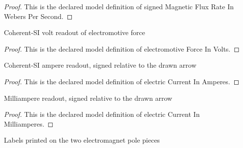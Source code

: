 \begin{proof}
  This is the declared model definition of signed Magnetic Flux Rate In Webers Per Second.
\end{proof}
\begin{definition}
  \label{def:physics:phyx-mini-0917:phyxminiproblems-problemphyxmini0917-electromotiveforceinvolts}
  Coherent-SI volt readout of electromotive force
\end{definition}
\begin{proof}
  This is the declared model definition of electromotive Force In Volts.
\end{proof}
\begin{definition}
  \label{def:physics:phyx-mini-0917:phyxminiproblems-problemphyxmini0917-electriccurrentinamperes}
  Coherent-SI ampere readout, signed relative to the drawn arrow
\end{definition}
\begin{proof}
  This is the declared model definition of electric Current In Amperes.
\end{proof}
\begin{definition}
  \label{def:physics:phyx-mini-0917:phyxminiproblems-problemphyxmini0917-electriccurrentinmilliamperes}
  Milliampere readout, signed relative to the drawn arrow
\end{definition}
\begin{proof}
  This is the declared model definition of electric Current In Milliamperes.
\end{proof}
\begin{definition}
  \label{def:physics:phyx-mini-0917:phyxminiproblems-problemphyxmini0917-magneticpole}
  Labels printed on the two electromagnet pole pieces
\end{definition}
